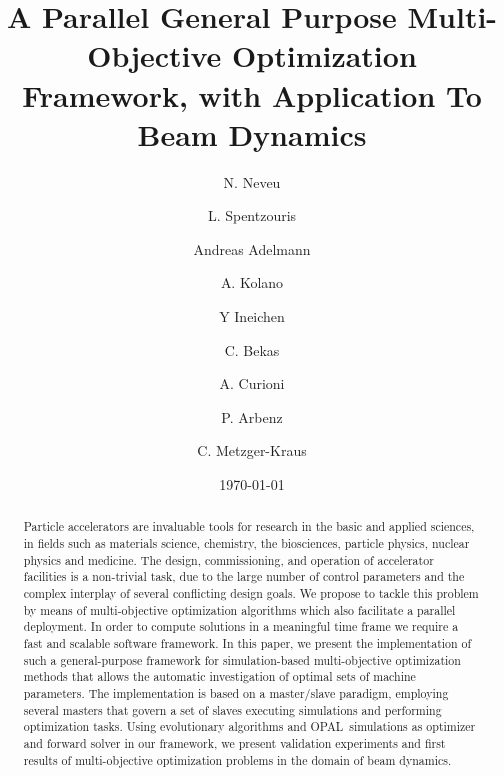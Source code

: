 \documentclass[%
reprint,
amsmath,amssymb,
aps,
]{revtex4-1}
\begin{document}
\title{A Parallel General Purpose Multi-Objective Optimization Framework,
  with Application To Beam Dynamics}



\author{N. Neveu}

\author{L. Spentzouris}

\author{Andreas Adelmann}
\author{A. Kolano}

%

\author{Y Ineichen}%

\author{C. Bekas}
\author{A. Curioni}

%

\author{P. Arbenz}
%

\author{C. Metzger-Kraus }
%

\date{\today}%


\begin{abstract}
Particle accelerators are invaluable tools for research in the basic and
  applied sciences, in fields such as materials science, chemistry,
  the biosciences, particle physics, nuclear physics and medicine.
The design, commissioning, and operation of accelerator facilities is a
  non-trivial task, due to the large number of control parameters and the
  complex interplay of several conflicting design goals.
We propose to tackle this problem by means of multi-objective optimization
  algorithms which also facilitate a parallel deployment.
In order to compute solutions in a meaningful time frame we require a fast
  and scalable software framework.
In this paper, we present the implementation of such a general-purpose
  framework for simulation-based multi-objective optimization methods that
  allows the automatic investigation of optimal sets of machine parameters.
The implementation is based on a master/slave paradigm, employing several
  masters that govern a set of slaves executing simulations and performing
  optimization tasks.
Using evolutionary algorithms and \textsc{OPAL}~simulations as optimizer and
  forward solver in our framework, we present validation experiments and first
  results of multi-objective optimization problems in the domain of beam
  dynamics.
  
\end{abstract}
\end{document}
